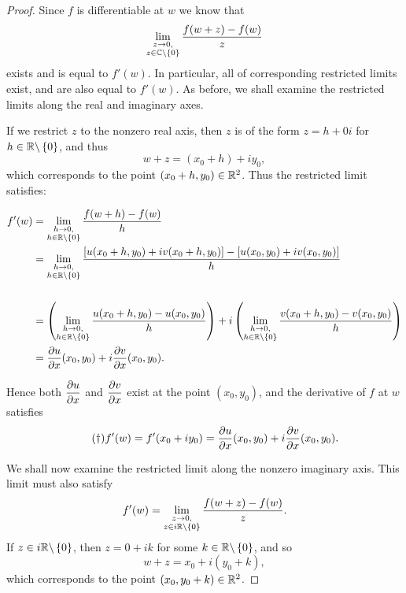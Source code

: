 \begin{proof}%
Since $f$ is differentiable at $w$ we know that
\[
\lim_{\substack{z\to 0, \\ z \in \mathbb{C} \backslash \left\{0\right\}}} \frac{f(w+z)-f(w)}{z}
\]
exists and is equal to $f'(w)$.  In particular, all of corresponding restricted limits exist, and are also equal to $f'(w)$.  As before, we shall examine the restricted limits along the real and imaginary axes.

If we restrict $z$ to the nonzero real axis, then $z$ is of the form $z=h+0i$ for $h \in \mathbb{R} \backslash \left\{0\right\}$, and thus
\[
w+z = (x_0+h)+iy_0,
\]
which corresponds to the point $(x_0+h,y_0) \in \mathbb{R}^2$.  Thus the restricted limit satisfies:

\begin{align*}
f'(w) & = \rlim{h \to 0}{h \in \R \backslash \set{0}} \frac{f(w+h)-f(w)}{h} \\
& = \rlim{h \to 0}{h \in \R \backslash \set{0}} \frac{\left[ u(x_0+h,y_0)+iv(x_0+h,y_0) \right] - \left[ u(x_0,y_0)+iv(x_0,y_0) \right]}{h} \\
& \vspace*{2cm} \\
& = \left( \rlim{h \to 0}{h \in \R \backslash \set{0}} \frac{u(x_0+h,y_0)-u(x_0,y_0)}{h}  \right) +i \left(  \rlim{h \to 0}{h \in \R \backslash \set{0}} \frac{v(x_0+h,y_0)-v(x_0,y_0)}{h} \right)  \\
& = \pd{u}{x} (x_0,y_0)+i \pd{v}{x} (x_0,y_0).
\end{align*}

Hence both $\dfrac{\partial u}{\partial x}$ and $\dfrac{\partial v}{\partial x}$ exist at the point $(x_0,y_0)$, and the derivative of $f$ at $w$ satisfies
\begin{equation}
\label{eq:cr1}
\tag{$\dagger$}
f'(w) = f'(x_0+iy_0) = \dfrac{\partial u}{\partial x} (x_0,y_0)+i \dfrac{\partial v}{\partial x} (x_0,y_0).
\end{equation}

We shall now examine the restricted limit along the nonzero imaginary axis. This limit must also satisfy
\[
f'(w) = \lim_{\substack{z\to 0, \\ z \in i \mathbb{R} \backslash \left\{0\right\}}} \frac{f(w+z)-f(w)}{z}.
\]
If $z \in i \mathbb{R} \backslash \left\{0\right\}$, then $z=0+ik$ for some $k \in \mathbb{R} \backslash \left\{0\right\}$, and so
\[
w+z=x_0+i(y_0+k),
\]
which corresponds to the point  $(x_0,y_0+k) \in \mathbb{R}^2$.


\end{proof}

